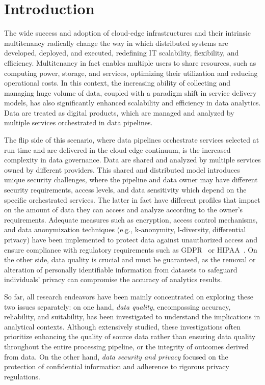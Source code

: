 \section{Introduction}
The wide success and adoption of cloud-edge infrastructures and their intrinsic multitenancy radically change the way in which distributed systems are developed, deployed, and executed, redefining IT scalability, flexibility, and efficiency. Multitenancy in fact enables multiple users to share resources, such as computing power, storage, and services, optimizing their utilization and reducing operational costs. In this context, the increasing ability of collecting and managing huge volume of data, coupled with a paradigm shift in service delivery models, has also significantly enhanced scalability and efficiency in data analytics. Data are treated as digital products, which are managed and analyzed by multiple services orchestrated in data pipelines.

The flip side of this scenario, where data pipelines orchestrate services selected at run time and are delivered in the cloud-edge continuum, is the increased complexity in data governance. Data are shared and analyzed by multiple services owned by different providers. This shared and distributed model introduces unique security challenges, where the pipeline and data owner may have different security requirements, access levels, and data sensitivity which depend on the specific orchestrated services. The latter in fact have different profiles that impact on the amount of data they can access and analyze according to the owner's requirements.
%
Adequate measures such as encryption, access control mechanisms, and data anonymization techniques (e.g., k-anonymity, l-diversity, differential privacy) have been implemented to protect data against unauthorized access and ensure compliance with regulatory requirements such as GDPR~\cite{EuropeanParliament2016a} or HIPAA~\cite{hipaa1996}. On the other side, data quality is crucial and must be guaranteed, as the removal or alteration of personally identifiable information from datasets to safeguard individuals' privacy can compromise the accuracy of analytics results.

So far, all research endeavors have been mainly concentrated on exploring these two issues separately: on one hand, \emph{data quality}, encompassing accuracy, reliability, and suitability, has been investigated to understand the implications in analytical contexts. Although extensively studied, these investigations often prioritize enhancing the quality of source data rather than ensuring data quality throughout the entire processing pipeline, or the integrity of outcomes derived from data. On the other hand, \emph{data security and privacy} focused on the protection of confidential information and adherence to rigorous privacy regulations.

